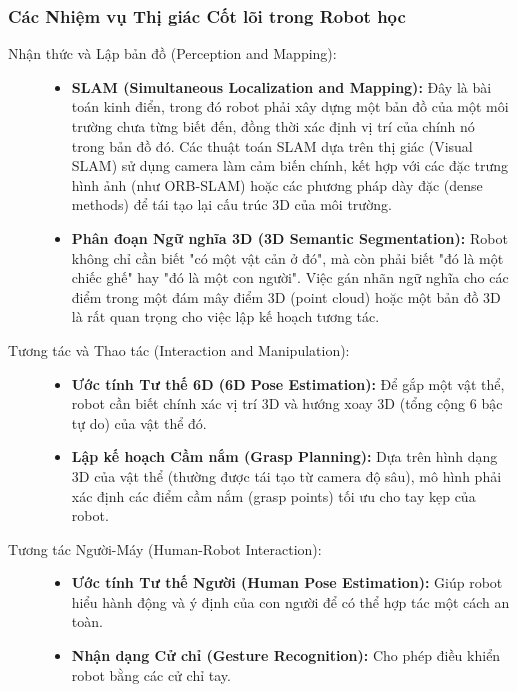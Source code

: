 \subsubsection{Các Nhiệm vụ Thị giác Cốt lõi trong Robot học}
\label{subsubsec:core_robotics_vision_tasks}
\begin{description}
	\item[Nhận thức và Lập bản đồ (Perception and Mapping):]
	\begin{itemize}
		\item \textbf{SLAM (Simultaneous Localization and Mapping):} Đây là bài toán kinh điển, trong đó robot phải xây dựng một bản đồ của một môi trường chưa từng biết đến, đồng thời xác định vị trí của chính nó trong bản đồ đó. Các thuật toán SLAM dựa trên thị giác (Visual SLAM) sử dụng camera làm cảm biến chính, kết hợp với các đặc trưng hình ảnh (như ORB-SLAM) hoặc các phương pháp dày đặc (dense methods) để tái tạo lại cấu trúc 3D của môi trường.
		\item \textbf{Phân đoạn Ngữ nghĩa 3D (3D Semantic Segmentation):} Robot không chỉ cần biết "có một vật cản ở đó", mà còn phải biết "đó là một chiếc ghế" hay "đó là một con người". Việc gán nhãn ngữ nghĩa cho các điểm trong một đám mây điểm 3D (point cloud) hoặc một bản đồ 3D là rất quan trọng cho việc lập kế hoạch tương tác.
	\end{itemize}
	\item[Tương tác và Thao tác (Interaction and Manipulation):]
	\begin{itemize}
		\item \textbf{Ước tính Tư thế 6D (6D Pose Estimation):} Để gắp một vật thể, robot cần biết chính xác vị trí 3D và hướng xoay 3D (tổng cộng 6 bậc tự do) của vật thể đó.
		\item \textbf{Lập kế hoạch Cầm nắm (Grasp Planning):} Dựa trên hình dạng 3D của vật thể (thường được tái tạo từ camera độ sâu), mô hình phải xác định các điểm cầm nắm (grasp points) tối ưu cho tay kẹp của robot.
	\end{itemize}
	\item[Tương tác Người-Máy (Human-Robot Interaction):]
	\begin{itemize}
		\item \textbf{Ước tính Tư thế Người (Human Pose Estimation):} Giúp robot hiểu hành động và ý định của con người để có thể hợp tác một cách an toàn.
		\item \textbf{Nhận dạng Cử chỉ (Gesture Recognition):} Cho phép điều khiển robot bằng các cử chỉ tay.
	\end{itemize}
\end{description}

